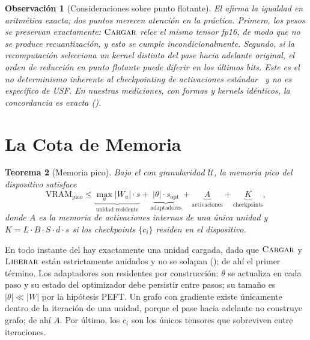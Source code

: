 \documentclass[journal]{IEEEtran}
\newtheorem{theorem}{Teorema}
\newtheorem{remark}[theorem]{Observación}
\newcommand{\usf}{USF}
\newcommand{\Wu}{\lvert W_u \rvert}
\begin{document}
\begin{remark}[Consideraciones sobre punto flotante]
\label{rem:fp}
El  afirma la igualdad en aritmética exacta; dos puntos merecen atención en la
práctica. Primero, los pesos se preservan exactamente: $\textsc{Cargar}$ relee el mismo tensor
fp16, de modo que no se produce recuantización, y esto se cumple incondicionalmente. Segundo, si la
recomputación selecciona un \emph{kernel} distinto del pase hacia adelante original, el orden de
reducción en punto flotante puede diferir en los últimos bits. Este es el no determinismo inherente
al checkpointing de activaciones estándar~\cite{chen2016checkpointing} y no es específico de
\usf{}. En nuestras mediciones, con formas y \emph{kernels} idénticos, la concordancia es exacta
().
\end{remark}

\section{La Cota de Memoria}
\label{sec:vram}

\begin{theorem}[Memoria pico]
\label{thm:vram}
Bajo el  con granularidad $\mathcal{U}$, la memoria pico del dispositivo satisface
\begin{equation}
\label{eq:vram}
\mathrm{VRAM}_{\text{pico}} \le \underbrace{\max_u \Wu \cdot s}_{\text{unidad residente}}
+ \underbrace{|\theta|\cdot s_{\text{opt}}}_{\text{adaptadores}}
+ \underbrace{A}_{\text{activaciones}}
+ \underbrace{K}_{\text{checkpoints}},
\end{equation}
donde $A$ es la memoria de activaciones internas de una \emph{única} unidad y
$K = L\cdot B\cdot S\cdot d\cdot s$ si los checkpoints $\{c_i\}$ residen en el dispositivo.
\end{theorem}

\begin{IEEEproof}
En todo instante del  hay exactamente una unidad cargada, dado que $\textsc{Cargar}$
y $\textsc{Liberar}$ están estrictamente anidados y no se solapan (); de ahí el
primer término. Los adaptadores son residentes por construcción: $\theta$ se actualiza en cada paso
y su estado del optimizador debe persistir entre pasos; su tamaño es $|\theta| \ll |W|$ por la
hipótesis PEFT. Un grafo con gradiente existe únicamente dentro de la iteración de una unidad,
porque el pase hacia adelante no construye grafo; de ahí $A$. Por último, los $c_i$ son los únicos
tensores que sobreviven entre iteraciones.
\end{IEEEproof}
\end{document}
